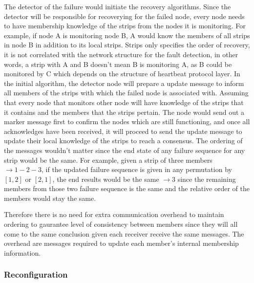 The detector of the failure would initiate the recovery algorithms.
Since the detector will be responsible for recoverying for the failed node,
every node needs to have membership knowledge of the strips from the nodes it
is monitoring. For example, if node A is monitoring node B, A would know the
members of all strips in node B in addition to its local strips. Strips only
specifies the order of recovery, it is not correlated with the network
structure for the fault detection, in other words, a strip with A and B doesn't
mean B is monitoring A, as B could be monitored by C which depends on the
structure of heartbeat protocol layer.
In the initial algorithm, the detector node will prepare a update message to
inform all members of the strips with which the failed node is associated with.
Assuming that every node that monitors other node will have knowledge of the
strips that it contains and the members that the strips pertain. The node would
send out a marker message first to confirm the nodes which are still
functioning, and once all acknowledges have been received, it will proceed to
send the update message to update their local knowledge of the strips to reach
a consensus. The ordering of the messages wouldn't matter since the end state
of any failure sequence for any strip would be the same. For example, given
a strip of three members $\rightarrow 1-2-3$, if the updated failure sequence
is given in any permutation by $[1, 2]$ or $[2, 1]$, the end results would be
the same $\rightarrow 3$ since the remaining members from those two failure
sequence is the same and the relative order of the members would stay the same.

Therefore there is no need for extra communication overhead to maintain
ordering to gaurantee level of consistency between members since they will all
come to the same conclusion given each receiver receive the same messages. The
overhead are messages required to update each member's internal membership
information.


\subsubsection{Reconfiguration}
\label{s:reconfig}


